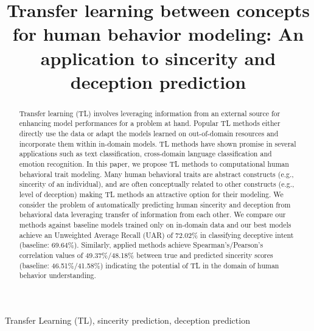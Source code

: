 \documentclass{article}
\title{Transfer learning between concepts for human behavior modeling: An application to sincerity and deception prediction}
\begin{document}
\ninept
%
\maketitle
%
\begin{abstract}
Transfer learning (TL) involves leveraging information from an external source for enhancing model performances for a problem at hand. 
Popular TL methods either directly use the data or adapt the models learned on out-of-domain resources and incorporate them within in-domain models. 
TL methods have shown promise in several applications such as text classification, cross-domain language classification and emotion recognition.
In this paper, we propose TL methods to computational human behavioral trait modeling. Many human behavioral traits are abstract constructs (e.g., sincerity of an individual), and are often conceptually related to other constructs (e.g., level of deception) making TL methods an attractive option for their modeling. We consider the problem of automatically predicting human sincerity and deception from behavioral data leveraging transfer of information from each other. 
We compare our methods against baseline models trained only on in-domain data and our best models achieve an Unweighted Average Recall (UAR) of 72.02\% in classifying deceptive intent (baseline: 69.64\%). 
Similarly, applied methods achieve Spearman's/Pearson's correlation values of 49.37\%/48.18\% between true and predicted sincerity scores (baseline: 46.51\%/41.58\%) indicating the potential of TL in the domain of human behavior understanding.
 
\end{abstract}
%
\begin{keywords}
Transfer Learning (TL), sincerity prediction, deception prediction 
\end{keywords}
%
\end{document}
